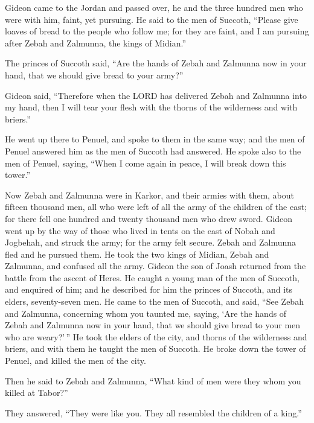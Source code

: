  Gideon came to the Jordan and passed over, he and the
three hundred men who were with him, faint, yet pursuing. 
He said to the men of Succoth, ``Please give loaves of bread to the
people who follow me; for they are faint, and I am pursuing after Zebah
and Zalmunna, the kings of Midian.''

 The princes of Succoth said, ``Are the hands of Zebah and
Zalmunna now in your hand, that we should give bread to your army?''

 Gideon said, ``Therefore when the LORD has delivered
Zebah and Zalmunna into my hand, then I will tear your flesh with the
thorns of the wilderness and with briers.''

 He went up there to Penuel, and spoke to them in the same
way; and the men of Penuel answered him as the men of Succoth had
answered.  He spoke also to the men of Penuel, saying,
``When I come again in peace, I will break down this tower.''

 Now Zebah and Zalmunna were in Karkor, and their armies
with them, about fifteen thousand men, all who were left of all the army
of the children of the east; for there fell one hundred and twenty
thousand men who drew sword.  Gideon went up by the way
of those who lived in tents on the east of Nobah and Jogbehah, and
struck the army; for the army felt secure.  Zebah and
Zalmunna fled and he pursued them. He took the two kings of Midian,
Zebah and Zalmunna, and confused all the army.  Gideon
the son of Joash returned from the battle from the ascent of Heres.
 He caught a young man of the men of Succoth, and
enquired of him; and he described for him the princes of Succoth, and
its elders, seventy-seven men.  He came to the men of
Succoth, and said, ``See Zebah and Zalmunna, concerning whom you taunted
me, saying, `Are the hands of Zebah and Zalmunna now in your hand, that
we should give bread to your men who are weary?'\,''  He
took the elders of the city, and thorns of the wilderness and briers,
and with them he taught the men of Succoth.  He broke
down the tower of Penuel, and killed the men of the city.

 Then he said to Zebah and Zalmunna, ``What kind of men
were they whom you killed at Tabor?''

They answered, ``They were like you. They all resembled the children of
a king.''

